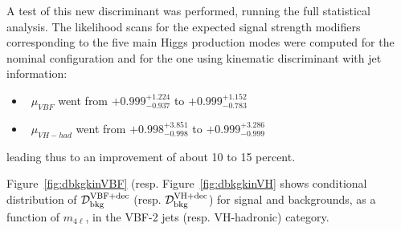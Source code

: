 A test of this new discriminant was performed, running the full statistical analysis. The likelihood scans for the expected signal strength modifiers corresponding to the five main Higgs production modes were computed for the nominal configuration and for the one using kinematic discriminant with jet information:
\begin{itemize}
\item~$\mu_{VBF}$ went from $+0.999^{+1.224}_{-0.937}$ to  $+0.999^{+1.152}_{-0.783}$
\item~$\mu_{VH-had}$ went from $+0.998^{+3.851}_{-0.998}$ to  $+0.999^{+3.286}_{-0.999}$
\end{itemize}

leading thus to an improvement of about 10 to 15 percent. 

Figure~\ref{fig:dbkgkinVBF} (resp. Figure~\ref{fig:dbkgkinVH} shows conditional distribution of ${\mathcal{D}}^{\mathrm{VBF}+\mathrm{dec}}_{\mathrm{bkg}}$ (resp. ${\mathcal{D}}^{\mathrm{VH}+\mathrm{dec}}_{\mathrm{bkg}}$) for signal and backgrounds,  as a function of $m_{4\ell}$, in the VBF-2 jets (resp. VH-hadronic) category.

